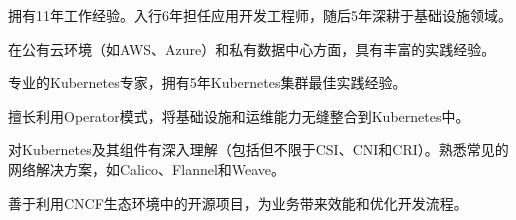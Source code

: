 

\begin{cvparagraph}


拥有11年工作经验。入行6年担任应用开发工程师，随后5年深耕于基础设施领域。

在公有云环境（如AWS、Azure）和私有数据中心方面，具有丰富的实践经验。

专业的Kubernetes专家，拥有5年Kubernetes集群最佳实践经验。

擅长利用Operator模式，将基础设施和运维能力无缝整合到Kubernetes中。

对Kubernetes及其组件有深入理解（包括但不限于CSI、CNI和CRI）。熟悉常见的网络解决方案，如Calico、Flannel和Weave。

善于利用CNCF生态环境中的开源项目，为业务带来效能和优化开发流程。



\end{cvparagraph}



